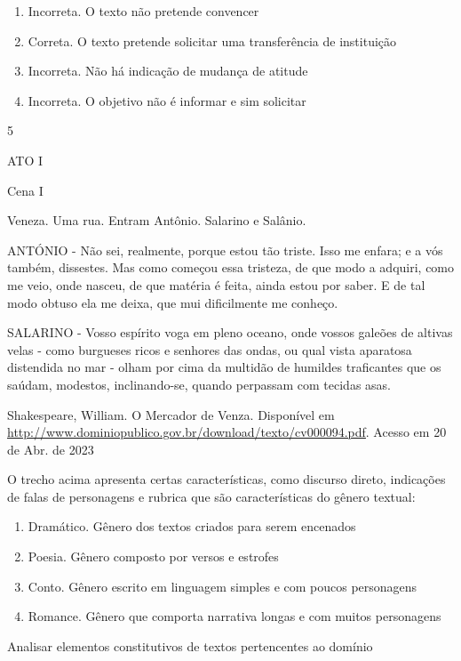 {{\begin{escolha}
{\begin{itemize}
\begin{itemize}
\begin{enumerate}
\def\labelenumi{\arabic{enumi}.}
\item
  Incorreta. O texto não pretende convencer
\item
  Correta. O texto pretende solicitar uma transferência de instituição
\item
  Incorreta. Não há indicação de mudança de atitude
\item
  Incorreta. O objetivo não é informar e sim solicitar
\end{enumerate}

\num{5}

ATO I

Cena I

Veneza. Uma rua. Entram Antônio. Salarino e Salânio.

ANTÓNIO - Não sei, realmente, porque estou tão triste. Isso me enfara; e
a vós também, dissestes. Mas como começou essa tristeza, de que modo a
adquiri, como me veio, onde nasceu, de que matéria é feita, ainda estou
por saber. E de tal modo obtuso ela me deixa, que mui dificilmente me
conheço.

SALARINO - Vosso espírito voga em pleno oceano, onde vossos galeões de
altivas velas - como burgueses ricos e senhores das ondas, ou qual vista
aparatosa distendida no mar - olham por cima da multidão de humildes
traficantes que os saúdam, modestos, inclinando-se, quando perpassam com
tecidas asas.

Shakespeare, William. O Mercador de Venza. Disponível em
\href{http://www.dominiopublico.gov.br/download/texto/cv000094.pdf}{\uline{http://www.dominiopublico.gov.br/download/texto/cv000094.pdf}}.
Acesso em 20 de Abr. de 2023

O trecho acima apresenta certas características, como discurso direto,
indicações de falas de personagens e rubrica que são características do
gênero textual:

\begin{enumerate}
\def\labelenumi{\alph{enumi})}
\item
  Dramático. Gênero dos textos criados para serem encenados
\item
  Poesia. Gênero composto por versos e estrofes
\item
  Conto. Gênero escrito em linguagem simples e com poucos personagens
\item
  Romance. Gênero que comporta narrativa longas e com muitos personagens
\end{enumerate}

Analisar elementos constitutivos de textos pertencentes ao domínio


\end{itemize}
\end{itemize}}
\end{escolha}}}

